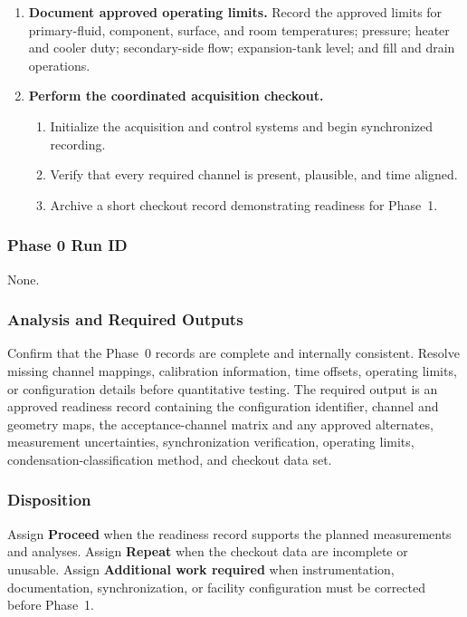 \documentclass[11pt]{article}
\begin{document}
\begin{enumerate}
    \item \textbf{Document approved operating limits.}
    Record the approved limits for primary-fluid, component, surface, and room temperatures; pressure; heater and cooler duty; secondary-side flow; expansion-tank level; and fill and drain operations.

    \item \textbf{Perform the coordinated acquisition checkout.}
    \begin{enumerate}
        \item Initialize the acquisition and control systems and begin synchronized recording.
        \item Verify that every required channel is present, plausible, and time aligned.
        \item Archive a short checkout record demonstrating readiness for Phase~1.
    \end{enumerate}
\end{enumerate}

\subsubsection{Phase 0 Run ID}
None.

\subsubsection{Analysis and Required Outputs}

Confirm that the Phase~0 records are complete and internally consistent. Resolve missing channel mappings, calibration information, time offsets, operating limits, or configuration details before quantitative testing. The required output is an approved readiness record containing the configuration identifier, channel and geometry maps, the acceptance-channel matrix and any approved alternates, measurement uncertainties, synchronization verification, operating limits, condensation-classification method, and checkout data set.

\subsubsection{Disposition}

Assign \textbf{Proceed} when the readiness record supports the planned measurements and analyses. Assign \textbf{Repeat} when the checkout data are incomplete or unusable. Assign \textbf{Additional work required} when instrumentation, documentation, synchronization, or facility configuration must be corrected before Phase~1.
\end{document}
